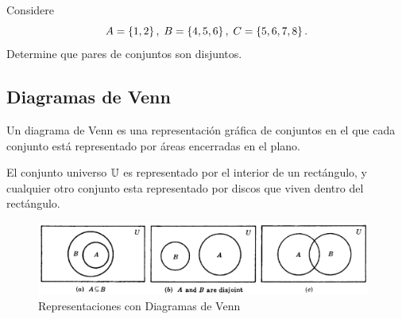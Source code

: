 	\begin{problema}
		Considere $$
		A=\left\{ 1,2 \right\}, \; B=\left\{ 4,5,6 \right\}, \; C=\left\{ 5,6,7,8 \right\}.
		$$
		Determine que pares de conjuntos son disjuntos. 
	\end{problema}
	


\subsection{Diagramas de Venn}


	Un diagrama de Venn es una representación gráfica de conjuntos en el que cada conjunto está representado por áreas encerradas en el plano.



	El conjunto universo $\mathbb{U}$ es representado por el interior de un rectángulo, y cualquier otro conjunto esta representado por discos que viven dentro del rectángulo.



	\begin{figure}
		\centering
		\includegraphics[width=11cm,keepaspectratio=true]{./md/venn01.png}
		\caption{Representaciones con Diagramas de Venn}
		\label{fig:0101}
	\end{figure}
	


%
%


